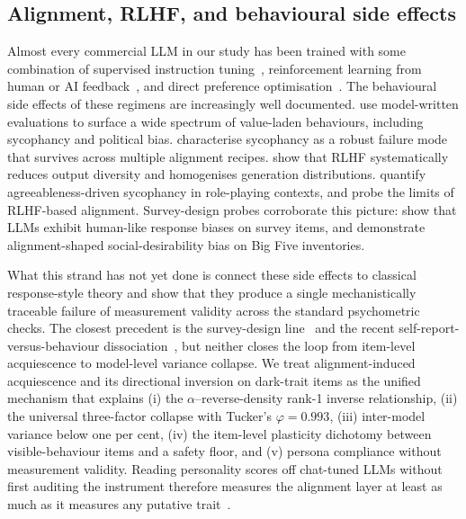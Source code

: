 \documentclass[11pt]{article}
\begin{document}
\subsection{Alignment, RLHF, and behavioural side effects}
\label{sec:related-alignment}

Almost every commercial LLM in our study has been trained with some combination of supervised instruction tuning~\citep{wei2022flan,ouyang2022training}, reinforcement learning from human or AI feedback~\citep{christiano2017deep,ouyang2022training,bai2022constitutional}, and direct preference optimisation~\citep{rafailov2023dpo}. The behavioural side effects of these regimens are increasingly well documented. \citet{perez2023discovering} use model-written evaluations to surface a wide spectrum of value-laden behaviours, including sycophancy and political bias. \citet{sharma2024sycophancy} characterise sycophancy as a robust failure mode that survives across multiple alignment recipes. \citet{kirk2023understanding} show that RLHF systematically reduces output diversity and homogenises generation distributions. \citet{zheng2024agreeableness} quantify agreeableness-driven sycophancy in role-playing contexts, and \citet{wang2024aligning} probe the limits of RLHF-based alignment. Survey-design probes corroborate this picture: \citet{tjuatja2023response} show that LLMs exhibit human-like response biases on survey items, and \citet{salecha2024llm} demonstrate alignment-shaped social-desirability bias on Big Five inventories.

What this strand has not yet done is connect these side effects to classical response-style theory and show that they produce a single mechanistically traceable failure of measurement validity across the standard psychometric checks. The closest precedent is the survey-design line~\citep{tjuatja2023response,dominguez2024questioning} and the recent self-report-versus-behaviour dissociation~\citep{han2025personality}, but neither closes the loop from item-level acquiescence to model-level variance collapse. We treat alignment-induced acquiescence and its directional inversion on dark-trait items as the unified mechanism that explains (i) the $\alpha$--reverse-density rank-1 inverse relationship, (ii) the universal three-factor collapse with Tucker's $\varphi=0.993$, (iii) inter-model variance below one per cent, (iv) the item-level plasticity dichotomy between visible-behaviour items and a safety floor, and (v) persona compliance without measurement validity. Reading personality scores off chat-tuned LLMs without first auditing the instrument therefore measures the alignment layer at least as much as it measures any putative trait~\citep{laverghetta2022predicting}.
\end{document}
